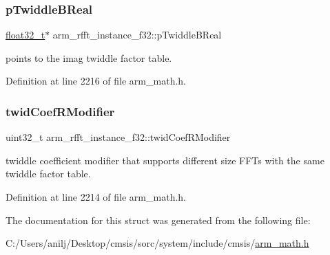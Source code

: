 \subsubsection{\texorpdfstring{p\+Twiddle\+B\+Real}{pTwiddleBReal}}
{\footnotesize\ttfamily \hyperlink{arm__math_8h_a4611b605e45ab401f02cab15c5e38715}{float32\+\_\+t}$\ast$ arm\+\_\+rfft\+\_\+instance\+\_\+f32\+::p\+Twiddle\+B\+Real}

points to the imag twiddle factor table. 

Definition at line 2216 of file arm\+\_\+math.\+h.

\mbox{\label{structarm__rfft__instance__f32_aede85350fb5ae6baa1b3e8bfa15b18d6}} 
\subsubsection{\texorpdfstring{twid\+Coef\+R\+Modifier}{twidCoefRModifier}}
{\footnotesize\ttfamily uint32\+\_\+t arm\+\_\+rfft\+\_\+instance\+\_\+f32\+::twid\+Coef\+R\+Modifier}

twiddle coefficient modifier that supports different size F\+F\+Ts with the same twiddle factor table. 

Definition at line 2214 of file arm\+\_\+math.\+h.



The documentation for this struct was generated from the following file\+:\begin{DoxyCompactItemize}
\item 
C\+:/\+Users/anilj/\+Desktop/cmsis/sorc/system/include/cmsis/\hyperlink{arm__math_8h}{arm\+\_\+math.\+h}\end{DoxyCompactItemize}
